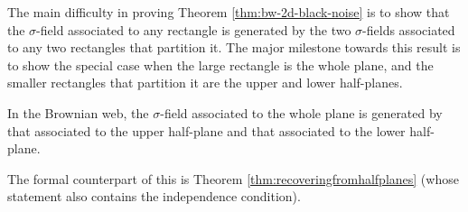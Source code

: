 {The main difficulty in proving
Theorem \ref{thm:bw-2d-black-noise} is to show that the $\sigma$-field
associated to any rectangle is generated by the two $\sigma$-fields
associated to any two rectangles that partition it.
The major milestone towards this result is to show the special case
when the large rectangle is the whole plane, and the smaller
rectangles that partition it are the upper and lower half-planes.

\begin{theorem}
\label{thm:informal-recovering-from-half-planes}
In the Brownian web, the $\sigma$-field associated to the whole plane
is generated by that associated to the upper half-plane and that
associated to the lower half-plane.
\end{theorem}

The formal counterpart of this is
Theorem \ref{thm:recoveringfromhalfplanes} (whose statement also
contains the independence condition).


}
